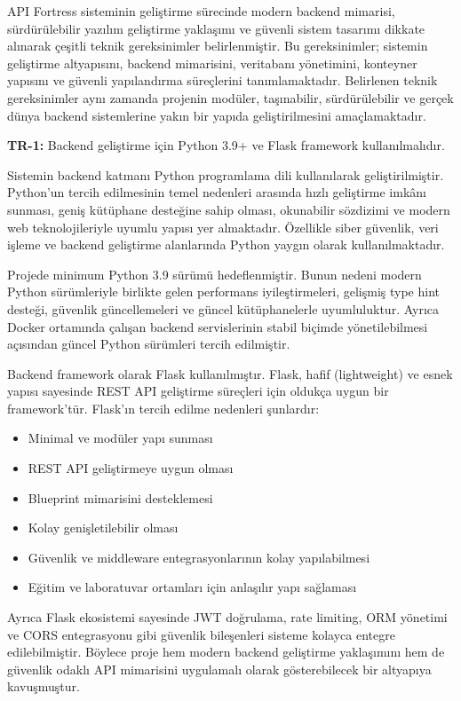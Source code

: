 API Fortress sisteminin geliştirme sürecinde modern backend mimarisi, sürdürülebilir yazılım geliştirme yaklaşımı ve güvenli sistem tasarımı dikkate alınarak çeşitli teknik gereksinimler belirlenmiştir. Bu gereksinimler; sistemin geliştirme altyapısını, backend mimarisini, veritabanı yönetimini, konteyner yapısını ve güvenli yapılandırma süreçlerini tanımlamaktadır. Belirlenen teknik gereksinimler aynı zamanda projenin modüler, taşınabilir, sürdürülebilir ve gerçek dünya backend sistemlerine yakın bir yapıda geliştirilmesini amaçlamaktadır.

\noindent\textbf{TR-1:} Backend geliştirme için Python 3.9+ ve Flask framework kullanılmalıdır.

Sistemin backend katmanı Python programlama dili kullanılarak geliştirilmiştir. Python’un tercih edilmesinin temel nedenleri arasında hızlı geliştirme imkânı sunması, geniş kütüphane desteğine sahip olması, okunabilir sözdizimi ve modern web teknolojileriyle uyumlu yapısı yer almaktadır. Özellikle siber güvenlik, veri işleme ve backend geliştirme alanlarında Python yaygın olarak kullanılmaktadır.

Projede minimum Python 3.9 sürümü hedeflenmiştir. Bunun nedeni modern Python sürümleriyle birlikte gelen performans iyileştirmeleri, gelişmiş type hint desteği, güvenlik güncellemeleri ve güncel kütüphanelerle uyumluluktur. Ayrıca Docker ortamında çalışan backend servislerinin stabil biçimde yönetilebilmesi açısından güncel Python sürümleri tercih edilmiştir.

Backend framework olarak Flask kullanılmıştır. Flask, hafif (lightweight) ve esnek yapısı sayesinde REST API geliştirme süreçleri için oldukça uygun bir framework’tür. Flask’ın tercih edilme nedenleri şunlardır:

\begin{itemize}[leftmargin=*]
    \item Minimal ve modüler yapı sunması
    \item REST API geliştirmeye uygun olması
    \item Blueprint mimarisini desteklemesi
    \item Kolay genişletilebilir olması
    \item Güvenlik ve middleware entegrasyonlarının kolay yapılabilmesi
    \item Eğitim ve laboratuvar ortamları için anlaşılır yapı sağlaması
\end{itemize}

Ayrıca Flask ekosistemi sayesinde JWT doğrulama, rate limiting, ORM yönetimi ve CORS entegrasyonu gibi güvenlik bileşenleri sisteme kolayca entegre edilebilmiştir. Böylece proje hem modern backend geliştirme yaklaşımını hem de güvenlik odaklı API mimarisini uygulamalı olarak gösterebilecek bir altyapıya kavuşmuştur.

